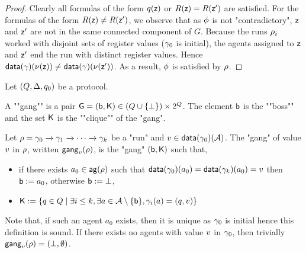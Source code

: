 \begin{proof}
	
	Clearly all formulas of the form $q(\mathsf{z})$ or $R(\mathsf{z}) = R(\mathsf{z}')$ are satisfied.
	For the formulas of the form $R(\mathsf{z}) \neq R(\mathsf{z}')$, we observe that as $\phi$ is not "contradictory", $\mathsf{z}$ and $\mathsf{z}'$ are not in the same connected component of $G$. Because the runs $\rho_i$ worked with disjoint sets of register values ($\gamma_0$ is initial), the agents assigned to $\mathsf{z}$ and $\mathsf{z}'$ end the run with distinct register values.
	Hence $\mathsf{data}(\gamma)(\nu(\mathsf{z})) \neq \mathsf{data}(\gamma)(\nu(\mathsf{z}'))$. As a result, $\phi$ is satisfied by $\rho$.
\end{proof}



\begin{definition}
	Let $(Q,\Delta, q_0)$ be a protocol.

	A ""gang"" is a pair $\mathsf{G} = (\mathsf{b}, \mathsf{K}) \in (Q \cup \{\bot\}) \times 2^{Q}$. The element $\mathsf{b}$ is the ""boss"" and the set $\mathsf{K}$ is the ""clique"" of the "gang". %

	Let $\rho = \gamma_0 \xrightarrow{} \gamma_1 \xrightarrow{} \cdots \xrightarrow{} \gamma_k$ be a "run" and $v \in \mathsf{data}(\gamma_0)(\mathcal{A})$. The "gang" of value $v$ in $\rho$, written $\mathsf{gang}_{v}(\rho)$, is the "gang" $(\mathsf{b}, \mathsf{K})$ such that, 
	\begin{itemize}
	\item if there exists $a_0 \in \mathsf{ag}(\rho)$ such that $\mathsf{data}(\gamma_0)(a_0) = \mathsf{data}(\gamma_k)(a_0) = v$ then $\mathsf{b} := a_0$, otherwise $\mathsf{b} := \bot$,
	\item  $\mathsf{K} := \{q \in Q \mid \exists i \leq k, \exists a \in \mathcal{A}\setminus \{\mathsf{b}\}, \gamma_i(a) = (q,v)\}$ %
	\end{itemize}
Note that, if such an agent $a_0$ exists, then it is unique as $\gamma_0$ is initial hence this definition is sound. If there exists no agents with value $v$ in $\gamma_0$, then trivially $\mathsf{gang}_{v}(\rho) = (\bot, \emptyset)$. 
\end{definition} 


